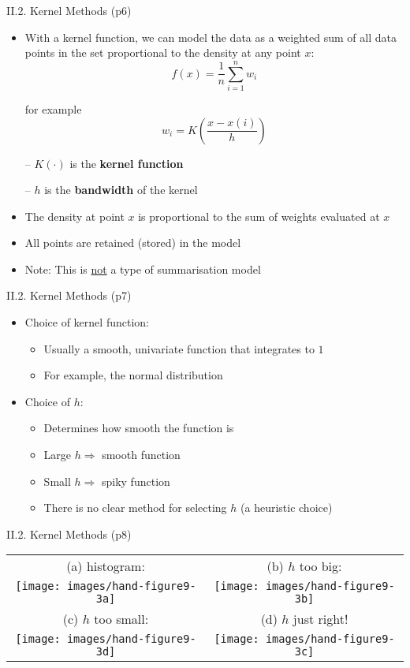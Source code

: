 \documentclass[handout]{beamer}
\newcommand{\stronger}[1]{\textbf{\color{purple} #1}}
\begin{document}
\begin{frame}{II.2. Kernel Methods (p6)}
\begin{itemize}
\item With a kernel function, we can model the data as a weighted sum of all data points in the set proportional to the density at any point $x$:
\[
	f(x) = \frac{1}{n} \sum_{i=1}^{n}{ w_i }
\]
\item[] for example
\[
	w_i = K( \frac{x-x(i)}{h} )
\]
\item[--] $K(\cdot)$ is the \stronger{kernel function}
\item[--] $h$ is the \stronger{bandwidth} of the kernel
\item The density at point $x$ is proportional to the sum of weights evaluated at $x$
\item All points are retained (stored) in the model
\item Note: This is \underline{not} a type of summarisation model
\end{itemize}
\end{frame}
\begin{frame}{II.2. Kernel Methods (p7)}
\begin{itemize}
\item Choice of kernel function:
	\begin{itemize}
	\item Usually a smooth, univariate function that integrates to $1$
	\item For example, the normal distribution
	\end{itemize}
\item[]
\item Choice of $h$:
	\begin{itemize}
	\item Determines how smooth the function is
	\item Large $h \Rightarrow$ smooth function
	\item Small $h \Rightarrow$ spiky function
	\item There is no clear method for selecting $h$ (a heuristic choice)
	\end{itemize}
\end{itemize}
\end{frame}
\begin{frame}{II.2. Kernel Methods (p8)}
\begin{center}
\begin{tabular}{cc}
(a) histogram: & (b) $h$ too big: \\
\texttt{[image: images/hand-figure9-3a]} &
\texttt{[image: images/hand-figure9-3b]} \\
(c) $h$ too small: & (d) $h$ just right! \\
\texttt{[image: images/hand-figure9-3d]} & 
\texttt{[image: images/hand-figure9-3c]} \\
\end{tabular}
\end{center}
\end{frame}
\end{document}
